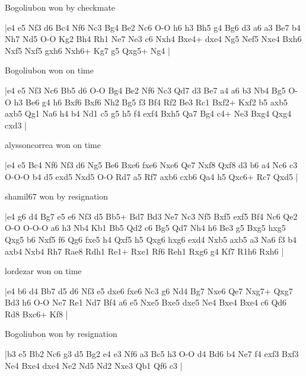 Bogoliubon won by checkmate

\makegametitle
|e4 e5 Nf3 d6 Bc4 Nf6 Nc3 Bg4 Be2 Nc6 O-O h6 h3 Bh5 g4 Bg6 d3 a6 a3 Be7 b4 Nh7 Nd5 O-O Kg2 Bh4 Rh1 Ne7 Ne3 c6 Nxh4 Bxe4+ dxe4 Ng5 Nef5 Nxe4 Bxh6 Nxf5 Nxf5 gxh6 Nxh6+ Kg7 g5 Qxg5+ Ng4  |

\showboard

Bogoliubon won on time

\makegametitle
|e4 e5 Nf3 Nc6 Bb5 d6 O-O Bg4 Be2 Nf6 Nc3 Qd7 d3 Be7 a4 a6 b3 Nb4 Bg5 O-O h3 Be6 g4 h6 Bxf6 Bxf6 Nh2 Bg5 f3 Bf4 Rf2 Be3 Rc1 Bxf2+ Kxf2 b5 axb5 axb5 Qg1 Na6 h4 b4 Nd1 c5 g5 h5 f4 exf4 Bxh5 Qa7 Bg4 c4+ Ne3 Bxg4 Qxg4 cxd3  |

\showboard

alyssoncorrea won on time

\makegametitle
|e4 e5 Bc4 Nf6 Nf3 d6 Ng5 Be6 Bxe6 fxe6 Nxe6 Qe7 Nxf8 Qxf8 d3 b6 a4 Nc6 c3 O-O-O b4 d5 exd5 Nxd5 O-O Rd7 a5 Rf7 axb6 cxb6 Qa4 h5 Qxc6+ Rc7 Qxd5  |

\showboard

shamil67 won by resignation

\makegametitle
|e4 g6 d4 Bg7 e5 e6 Nf3 d5 Bb5+ Bd7 Bd3 Ne7 Nc3 Nf5 Bxf5 exf5 Bf4 Nc6 Qe2 O-O O-O-O a6 h3 Nb4 Kb1 Bb5 Qd2 c6 Bg5 Qd7 Nh4 h6 Be3 g5 Bxg5 hxg5 Qxg5 b6 Nxf5 f6 Qg6 fxe5 h4 Qxf5 h5 Qxg6 hxg6 exd4 Nxb5 axb5 a3 Na6 f3 b4 axb4 Nxb4 Rh7 Rae8 Rdh1 Re1+ Rxe1 Rf6 Reh1 Rxg6 g4 Kf7 R1h6 Rxh6  |

\showboard

lordezar won on time

\makegametitle
|e4 b6 d4 Bb7 d5 d6 Nf3 e5 dxe6 fxe6 Nc3 g6 Nd4 Bg7 Nxe6 Qe7 Nxg7+ Qxg7 Bd3 h6 O-O Ne7 Re1 Nd7 Bf4 a6 e5 Nxe5 Bxe5 dxe5 Ne4 Bxe4 Bxe4 c6 Qd6 Rd8 Bxc6+ Kf8  |

\showboard

Bogoliubon won by resignation

\makegametitle
|b3 e5 Bb2 Nc6 g3 d5 Bg2 e4 e3 Nf6 a3 Bc5 h3 O-O d4 Bd6 b4 Ne7 f4 exf3 Bxf3 Ne4 Bxe4 dxe4 Ne2 Nd5 Nd2 Nxe3 Qb1 Qf6 c3  |

